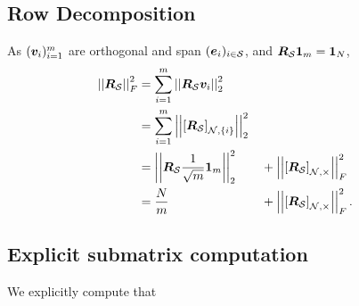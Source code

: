 \subsection{Row Decomposition}
\label{subapp:GLR_Proof:row_decomp}
As $(\bm{v}_{i})^{m}_{i=1}$ are orthogonal and span $(\bm{e}_{i})_{i \in \mathcal{S}}$, and $\bm{R}_{\mathcal{S}}\bm{1}_{m} = \bm{1}_{N}$,
\begin{align}
 \sqfrob{\matr{R}_{\set{S}}} &= \sum_{i=1}^{m} \left|\left| \matr{R}_{\set{S}}\vect{v}_{i}\right|\right|^{2}_{2} \\
 &=  \sum_{i=1}^{m} \left|\left| \left[\matr{R}_{\set{S}}\right]_{\set{N},\{i\}}\right|\right|^{2}_{2} \\
 &=\left|\left|\matr{R}_{\set{S}}\frac{1}{\sqrt{m}}\vect{1}_{m}\right|\right|^{2}_{2} &&+ \sqfrob{\msub[N, \Theta]{\matr{R}_{\set{S}}}} \\ 
    &= \frac{N}{m} &&+ \sqfrob{\msub[N, \Theta]{\matr{R}_{\set{S}}}}.
\end{align}


\subsection{Explicit submatrix computation}
\label{subapp:GLR_Proof:Explicit_submatrix}
We explicitly compute that 


